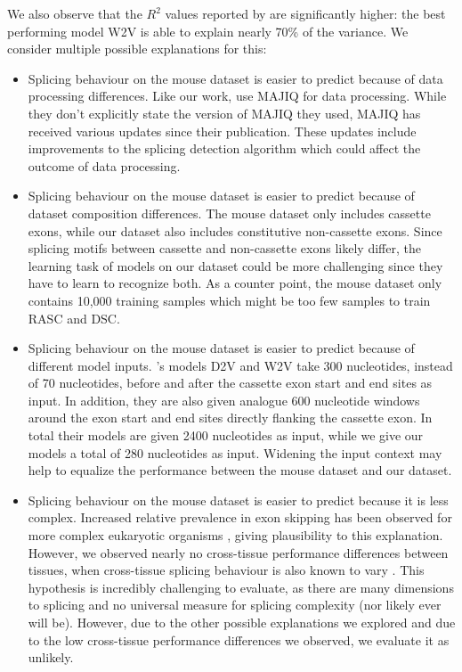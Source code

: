 We also observe that the $R^2$ values reported by \cite{d2vsplicing} are significantly higher: the best performing model W2V is able to explain nearly 70\% of the variance. We consider multiple possible explanations for this: 
\begin{itemize}
	\item Splicing behaviour on the mouse dataset is easier to predict because of data processing differences. Like our work, \cite{d2vsplicing} use MAJIQ for data processing. While they don't explicitly state the version of MAJIQ they used, MAJIQ has received various updates since their publication. These updates include improvements to the splicing detection algorithm which could affect the outcome of data processing. 
	\item Splicing behaviour on the mouse dataset is easier to predict because of dataset composition differences. The mouse dataset only includes cassette exons, while our dataset also includes constitutive non-cassette exons. Since splicing motifs between cassette and non-cassette exons likely differ, the learning task of models on our dataset could be more challenging since they have to learn to recognize both. As a counter point, the mouse dataset only contains 10,000 training samples which might be too few samples to train RASC and DSC.

	

	\item Splicing behaviour on the mouse dataset is easier to predict because of different model inputs. \cite{d2vsplicing}'s models D2V and W2V take 300 nucleotides, instead of 70 nucleotides, before and after the cassette exon start and end sites as input. In addition, they are also given analogue 600 nucleotide windows around the exon start and end sites directly flanking the cassette exon. In total their models are given 2400 nucleotides as input, while we give our models a total of 280 nucleotides as input. Widening the input context may help to equalize the performance between the mouse dataset and our dataset. 
	\item Splicing behaviour on the mouse dataset is easier to predict because it is less complex. Increased relative prevalence in exon skipping has been observed for more complex eukaryotic organisms \cite{splicing_current_perspectives}, giving plausibility to this explanation. However, we observed nearly no cross-tissue performance differences between tissues, when cross-tissue splicing behaviour is also known to vary \cite{crosstissuesplicing}. This hypothesis is incredibly challenging to evaluate, as there are many dimensions to splicing and no universal measure for splicing complexity (nor likely ever will be). However, due to the other possible explanations we explored and due to the low cross-tissue performance differences we observed, we evaluate it as unlikely.
	
\end{itemize}

